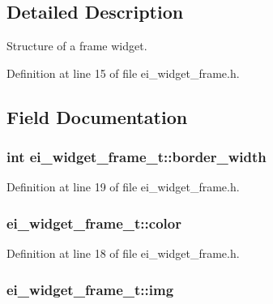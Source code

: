 \subsection{Detailed Description}
Structure of a frame widget. 

Definition at line 15 of file ei\-\_\-widget\-\_\-frame.\-h.



\subsection{Field Documentation}
\hypertarget{structei__widget__frame__t_aa1dbc2d7c29610d5d778afd279137f80}{
\subsubsection[{border\-\_\-width}]{\setlength{\rightskip}{0pt plus 5cm}int ei\-\_\-widget\-\_\-frame\-\_\-t\-::border\-\_\-width}}\label{structei__widget__frame__t_aa1dbc2d7c29610d5d778afd279137f80}


Definition at line 19 of file ei\-\_\-widget\-\_\-frame.\-h.

\hypertarget{structei__widget__frame__t_af0d87b04713786c206022aebb27c0647}{
\subsubsection[{color}]{ ei\-\_\-widget\-\_\-frame\-\_\-t\-::color}}\label{structei__widget__frame__t_af0d87b04713786c206022aebb27c0647}


Definition at line 18 of file ei\-\_\-widget\-\_\-frame.\-h.

\hypertarget{structei__widget__frame__t_ad50d7cdd8bc27d8f5cf12395c7f6877c}{
\subsubsection[{img}]{ ei\-\_\-widget\-\_\-frame\-\_\-t\-::img}}\label{structei__widget__frame__t_ad50d7cdd8bc27d8f5cf12395c7f6877c}



